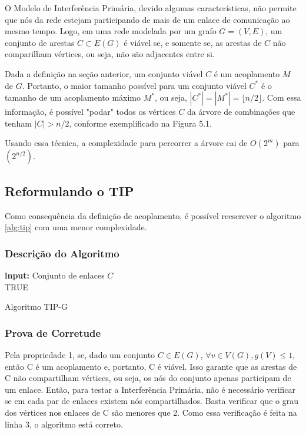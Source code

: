 O Modelo de Interferência Primária, devido algumas características, não permite que nós da rede estejam participando de mais de um enlace de comunicação ao mesmo tempo. Logo, em uma rede modelada por um grafo $G=(V,E)$, um conjunto de arestas $C \subset E(G)$ é viável se, e somente se, as arestas de $C$ não comparilham vértices, ou seja, não são adjacentes entre si. 

Dada a definição na seção anterior, um conjunto viável $C$ é um acoplamento $M$ de $G$. Portanto, o maior tamanho possível para um conjunto viável $C^*$ é o tamanho de um acoplamento máximo $M^*$, ou seja, $|C^*| = |M^*| = \lfloor n/2 \rfloor$. Com essa informação, é possível "podar" todos os vértices $C$ da árvore de combinações que tenham $|C|>n/2$, conforme exemplificado na Figura 5.1.


Usando essa técnica, a complexidade para percorrer a árvore cai de $O(2^m)$ para $(2^{n/2})$.

\subsection{Reformulando o TIP}

Como consequência da definição de acoplamento, é possível reescrever o algoritmo \ref{alg:tip} com uma menor complexidade.

\subsubsection{Descrição do Algoritmo}

\begin{algorithm}[h]
	\SetVline
	{\bf input:} Conjunto de enlaces $C$\\
	\Return TRUE
\caption{Algoritmo TIP-G}
\label{alg:tipg}
\end{algorithm}

\subsubsection{Prova de Corretude}

Pela propriedade 1, se, dado um conjunto $C \in E(G)$, $\forall v \in V(G), g(V) \leq 1$, então C é um acoplamento e, portanto, C é viável. Isso garante que as arestas de C não compartilham vértices, ou seja, os nós do conjunto apenas participam de um enlace. Então, para testar a Interferência Primária, não é necessário verificar se em cada par de enlaces existem nós compartilhados. Basta verificar que o grau dos vértices nos enlaces de C são menores que 2. Como essa verificação é feita na linha 3, o algoritmo está correto.

